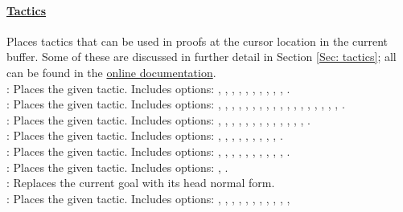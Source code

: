 \paragraph{\underline{Tactics}}
Places tactics that can be used in proofs at the cursor location in the current buffer. 
Some of these are discussed in further detail in Section \ref{Sec: tactics}; 
all can be found in the \href{https://coq.inria.fr/distrib/V8.10.2/refman/coq-tacindex.html}{online documentation}. 
~\\
 : Places the given tactic. Includes options: 
	, , , , , , 
	, , , , . 
\\
 : Places the given tactic. Includes options: 
	, , , , , , , 
	, , , , , , , 
	, , , , . 
\\
 : Places the given tactic. Includes options: 
	, , , , 
	, , , 
	, , , 
	, , , . 
\\
 : Places the given tactic. Includes options: 
	, , , , , , 
	, , , . 
\\
 : Places the given tactic. Includes options: 
	, , , , , , 
	, , , , . 
\\
 : Places the given tactic. Includes options: 
	, . 
\\
 : Replaces the current goal with its head normal form. 
\\
 : Places the given tactic. Includes options: 
	, , , , , , 
	, , , , , 
